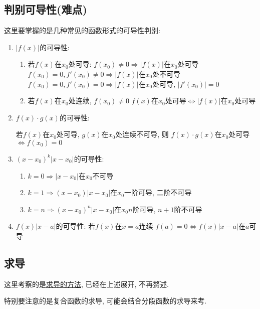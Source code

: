 \subsection{判别可导性(难点)}
这里要掌握的是几种常见的函数形式的可导性判别:
\begin{enumerate}
\item $ |f(x)| $的可导性:
\begin{enumerate}
\item 若$ f(x) $在$ x_{0} $处可导:
\subitem $ f(x_{0})\neq 0 \Rightarrow |f(x)| $在$ x_{0} $处可导
\subitem $ f(x_{0})=0, f'(x_{0})\neq 0 \Rightarrow |f(x)| $在$ x_{0} $处不可导
\subitem $ f(x_{0})=0, f'(x_{0})=0 \Rightarrow |f(x)| $在$ x_{0} $处可导, $ |f'(x_{0})|=0 $
\item 若$ f(x) $在$ x_{0} $处连续, $ f(x_{0})\neq 0 $
\subitem $ f(x) $在$ x_{0} $处可导$ \Leftrightarrow |f(x)| $在$ x_{0} $处可导
\end{enumerate}
\item $ f(x)\cdot g(x) $的可导性: \par 若$ f(x) $在$ x_{0} $处可导, $ g(x) $在$ x_{0} $处连续不可导, 则
\subitem $ f(x)\cdot g(x) $在$ x_{0} $处可导$ \Leftrightarrow f(x_{0})=0 $
\item $ (x-x_{0})^{k}|x-x_{0}| $的可导性:
\begin{enumerate}
\item $ k=0 \Rightarrow |x-x_{0}| $在$ x_{0} $不可导
\item $ k=1 \Rightarrow (x-x_{0})|x-x_{0}| $在$ x_{0} $一阶可导, 二阶不可导
\item $ k=n \Rightarrow (x-x_{0})^{n}|x-x_{0}| $在$ x_{0} $$ n $阶可导, $ n+1 $阶不可导
\end{enumerate}
\item $ f(x)|x-a| $的可导性: 若$ f(x) $在$ x=a $连续
\subitem $ f(a)=0\Leftrightarrow f(x)|x-a| $在$ a $可导
\end{enumerate}
\subsection{求导}
这里考察的是\hyperref[求导的方法]{求导的方法}, 已经在上述展开, 不再赘述.\par
特别要注意的是复合函数的求导, 可能会结合分段函数的求导来考. 
